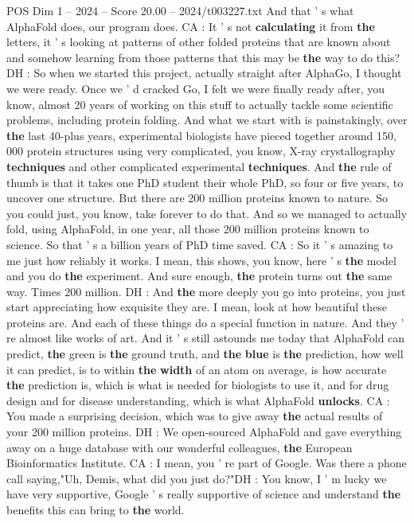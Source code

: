 \begin{textsample}{POS Dim 1 – 2024 – Score 20.00 – 2024/t003227.txt}
And that ' s what AlphaFold does, our program does.
CA : It ' s not \textbf{calculating} it from \textbf{the} letters, it ' s looking at patterns of other folded proteins that are known about and somehow learning from those patterns that this may be \textbf{the} way to do this?
DH : So when we started this project, actually straight after AlphaGo, I thought we were ready.
Once we ' d cracked Go, I felt we were finally ready after, you know, almost 20 years of working on this stuff to actually tackle some scientific problems, including protein folding.
And what we start with is painstakingly, over \textbf{the} last 40-plus years, experimental biologists have pieced together around 150, 000 protein structures using very complicated, you know, X-ray crystallography \textbf{techniques} and other complicated experimental \textbf{techniques}.
And \textbf{the} rule of thumb is that it takes one PhD student their whole PhD, so four or five years, to uncover one structure.
But there are 200 million proteins known to nature.
So you could just, you know, take forever to do that.
And so we managed to actually fold, using AlphaFold, in one year, all those 200 million proteins known to science.
So that ' s a billion years of PhD time saved.
CA : So it ' s amazing to me just how reliably it works.
I mean, this shows, you know, here ' s \textbf{the} model and you do \textbf{the} experiment.
And sure enough, \textbf{the} protein turns out \textbf{the} same way.
Times 200 million.
DH : And \textbf{the} more deeply you go into proteins, you just start appreciating how exquisite they are.
I mean, look at how beautiful these proteins are.
And each of these things do a special function in nature.
And they ' re almost like works of art.
And it ' s still astounds me today that AlphaFold can predict, \textbf{the} green is \textbf{the} ground truth, and \textbf{the} \textbf{blue} is \textbf{the} prediction, how well it can predict, is to within \textbf{the} \textbf{width} of an atom on average, is how accurate \textbf{the} prediction is, which is what is needed for biologists to use it, and for drug design and for disease understanding, which is what AlphaFold \textbf{unlocks}.
CA : You made a surprising decision, which was to give away \textbf{the} actual results of your 200 million proteins.
DH : We open-sourced AlphaFold and gave everything away on a huge database with our wonderful colleagues, \textbf{the} European Bioinformatics Institute.
CA : I mean, you ' re part of Google.
Was there a phone call saying,"Uh, Demis, what did you just do?"DH : You know, I ' m lucky we have very supportive, Google ' s really supportive of science and understand \textbf{the} benefits this can bring to \textbf{the} world.

\end{textsample}
